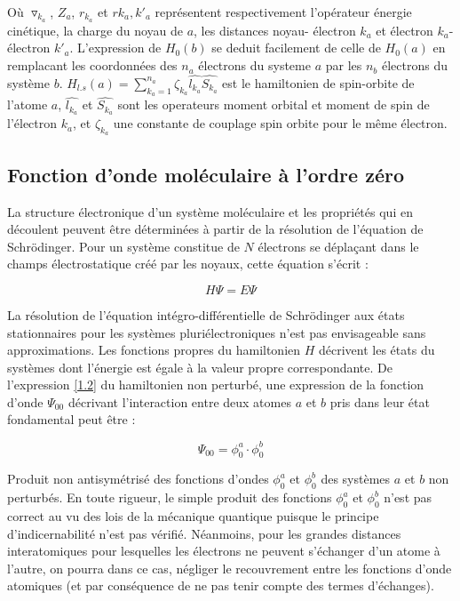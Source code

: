 	
	Où $\triangledown_{k_{a}}$, $Z_{a}$, $r_{k_{a}}$ et $rk_{a},k'_{a}$ représentent respectivement l'opérateur énergie cinétique, la charge du noyau de $a$, les distances noyau- électron $k_{a}$ et électron $k_{a}$- électron $k'_{a}$. L'expression de $H_{0}(b)$ se deduit facilement de celle de $H_{0}(a)$ en remplacant les coordonnées des $n_{a}$ électrons du systeme $a$ par les $n_{b}$ électrons du système $b$. $H_{l.s}(a)= \sum_{k_{a}=1}^{n_{a}} \zeta_{k_{a}} \widehat{l_{k_{a}}} \widehat{S_{k_{a}}}$ est le hamiltonien de spin-orbite de l'atome $a$, $\widehat{l_{k_{a}}}$ et $\widehat{S_{k_{a}}}$ sont les operateurs moment orbital et moment de spin de l'électron $k_{a}$, et $\zeta_{k_{a}}$ une constante de couplage spin orbite pour le même électron. 
	
	
	\subsection{Fonction d'onde moléculaire à l'ordre zéro}
	
	
	La structure électronique d'un système moléculaire et les propriétés qui en découlent peuvent être déterminées à partir de la résolution de l'équation de Schr\"{o}dinger. Pour un système constitue de $N$ électrons se déplaçant dans le champs électrostatique créé par les noyaux, cette équation s'écrit : 
	
	\begin{equation}
	H\Psi = E\Psi
	\end{equation}
	
	La résolution de l'équation intégro-différentielle de Schr\"{o}dinger aux états stationnaires pour les systèmes pluriélectroniques n'est pas envisageable sans approximations. Les fonctions propres du hamiltonien $H$ décrivent les états du systèmes dont l'énergie est égale à la valeur propre correspondante. De l'expression \ref{1.2} du hamiltonien non perturbé, une expression de la fonction d'onde $\Psi_{00}$ décrivant l'interaction entre deux atomes $a$ et $b$ pris dans leur état fondamental peut être : 
	
	\begin{equation}
	\Psi_{00} = \phi_{0}^{a} \cdot \phi_{0}^{b}
	\end{equation}
	
	Produit non antisymétrisé des fonctions d'ondes $\phi_{0}^{a}$ et $\phi_{0}^{b}$ des systèmes $a$ et $b$ non perturbés. En toute rigueur, le simple produit des fonctions $\phi_{0}^{a}$ et $\phi_{0}^{b}$ n'est pas correct au vu des lois de la mécanique quantique puisque le principe d'indicernabilité n'est pas vérifié. Néanmoins, pour les grandes distances interatomiques pour lesquelles les électrons ne peuvent s'échanger d'un atome à l'autre, on pourra dans ce cas, négliger le recouvrement entre les fonctions d'onde atomiques (et par conséquence de ne pas tenir compte des termes d'échanges).\\
	
